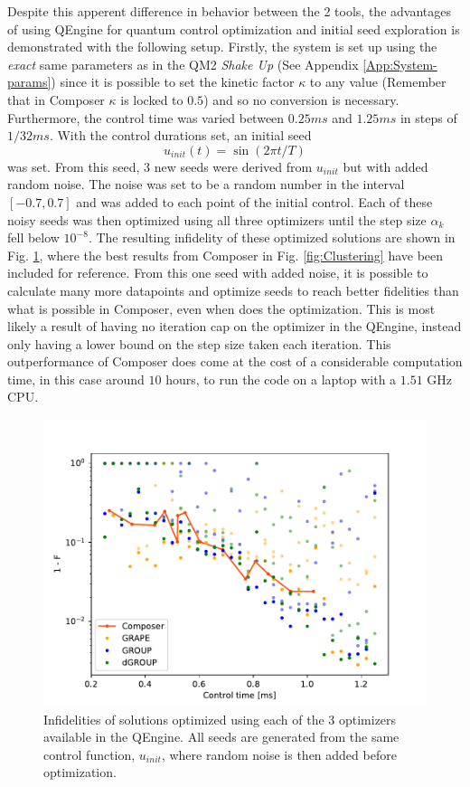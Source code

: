 \documentclass[a4paper, twocolumn]{revtex4-1}
\begin{document}
Despite this apperent difference in behavior between the 2 tools, the advantages of using QEngine for quantum control optimization and initial seed exploration is demonstrated with the following setup. Firstly, the system is set up using the \textit{exact} same parameters as in the QM2 \textit{Shake Up} (See Appendix \ref{App:System-params}) since it is possible to set the kinetic factor $\kappa$ to any value (Remember that in Composer $\kappa$ is locked to $0.5$) and so no conversion is necessary. Furthermore, the control time was varied between $0.25 ms$ and $1.25 ms$ in steps of $1/32 ms$. With the control durations set, an initial seed 
\begin{equation}
	u_{init}(t) = \sin(2\pi t/T)
\end{equation}
was set. From this seed, 3 new seeds were derived from $u_{init}$ but with added random noise. The noise was set to be a random number in the interval $[-0.7, 0.7]$ and was added to each point of the initial control. Each of these noisy seeds was then optimized using all three optimizers until the step size $\alpha_k$ fell below $10^{-8}$. The resulting infidelity of these optimized solutions are shown in Fig. \ref{fig:QEngine_noise}, where the best results from Composer in Fig. \ref{fig:Clustering} have been included for reference. From this one seed with added noise, it is possible to calculate many more datapoints and optimize seeds to reach better fidelities than what is possible in Composer, even when  does the optimization. This is most likely a result of having no iteration cap on the optimizer in the QEngine, instead only having a lower bound on the step size taken each iteration. This outperformance of Composer does come at the cost of a considerable computation time, in this case around $10$ hours, to run the code on a laptop with a $1.51$ GHz CPU.

\begin{figure}
	\includegraphics[width=\columnwidth]{graphics/qengine/noiseDemoInf.pdf}
	\caption{Infidelities of solutions optimized using each of the 3 optimizers available in the QEngine. All seeds are generated from the same control function, $u_{init}$, where random noise is then added before optimization. }
	\label{fig:QEngine_noise}
\end{figure}
\end{document}
